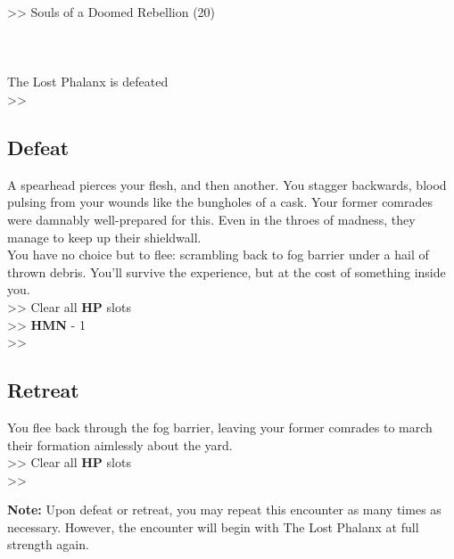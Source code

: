 >> Souls of a Doomed Rebellion (20)\\
\\
\\
\\
 The Lost Phalanx is defeated\\
>> 

\subsection*{Defeat}
A spearhead pierces your flesh, and then another. You stagger backwards, blood pulsing from your wounds like the bungholes of a cask. Your former comrades were damnably well-prepared for this. Even in the throes of madness, they manage to keep up their shieldwall.\\

You have no choice but to flee: scrambling back to fog barrier under a hail of thrown debris. You’ll survive the experience, but at the cost of something inside you.\\

>> Clear all \textbf{HP} slots\\
>> \textbf{HMN} - 1\\
>> 

\subsection*{Retreat}
You flee back through the fog barrier, leaving your former comrades to march their formation aimlessly about the yard.\\

>> Clear all \textbf{HP} slots\\
>> \\

\begin{tcolorbox}
\textbf{Note:} Upon defeat or retreat, you may repeat this encounter as many times as necessary. However, the encounter will begin with The Lost Phalanx at full strength again.
\end{tcolorbox}